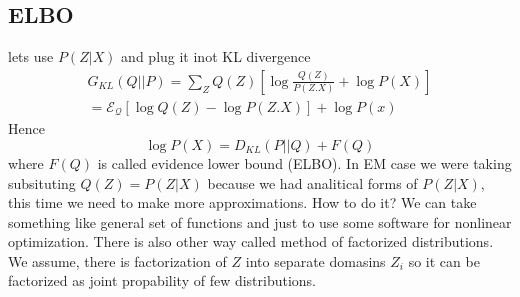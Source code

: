 \documentclass[12pt,a4paper]{article}
\begin{document}
\subsection{ELBO}
lets use $P(Z|X)$ and plug it inot KL divergence
\begin{align}
    G_{KL}(Q||P)=\sum_Z Q(Z)\left[ \log{\frac{Q(Z)}{P(Z.X)}}+\log{P(X)}\right]\\
    =\mathcal{E_{Q}}\left[\log{Q(Z)}-\log{P(Z.X)}\right] +\log{P(x)}
\end{align}
Hence
\begin{equation}
    \log{P(X)}=D_{KL}(P||Q)+F(Q)
\end{equation}
where $F(Q)$ is called evidence lower bound (ELBO). In EM case we were taking subsituting $Q(Z)=P(Z|X)$ because we had analitical forms of $P(Z|X)$, this time we need to make more approximations.
How to do it? We can take something like general set of functions and just to use some software for nonlinear optimization. There is also other way called method of factorized distributions.
We assume, there is factorization of $Z$ into separate domasins $Z_i$ so it can be factorized as joint propability of few distributions.
\end{document}
